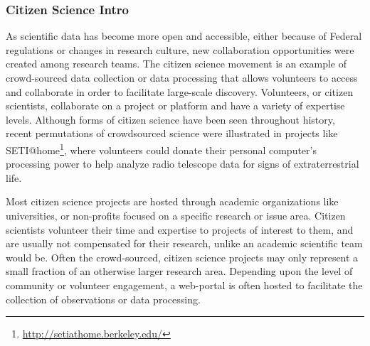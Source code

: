 \subsubsection{Citizen Science Intro}

As scientific data has become more open and accessible, either because of Federal regulations or changes in research culture, new collaboration opportunities were created among research teams. The citizen science movement is an example of crowd-sourced data collection or data processing that allows volunteers to access and collaborate in order to facilitate large-scale discovery. Volunteers, or citizen scientists, collaborate on a project or platform and have a variety of expertise levels. Although forms of citizen science have been seen throughout history, recent permutations of crowdsourced science were illustrated in projects like SETI@home\footnote{\url{http://setiathome.berkeley.edu/}}, where volunteers could donate their personal computer's processing power to help analyze radio telescope data for signs of extraterrestrial life. 

Most citizen science projects are hosted through academic organizations like universities, or non-profits focused on a specific research or issue area. Citizen scientists volunteer their time and expertise to projects of interest to them, and are usually not compensated for their research, unlike an academic scientific team would be. Often the crowd-sourced, citizen science projects may only represent a small fraction of an otherwise larger research area. Depending upon the level of community or volunteer engagement, a web-portal is often hosted to facilitate the collection of observations or data processing.
